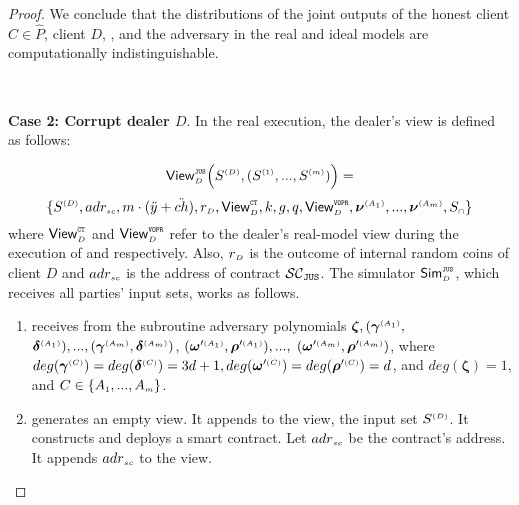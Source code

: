 \begin{proof}
We conclude that the distributions of the joint outputs of the honest client $C\in \hat P$, client $D$, \aud, and the adversary in the real and ideal models are computationally indistinguishable.


\

\noindent\textbf{Case 2: Corrupt dealer $D$}.  In the real execution, the dealer's view is defined as follows: 


$$ \mathsf{View}_{\scriptscriptstyle D}^{\scriptscriptstyle \mathtt{JUS}} \Big(S^{\scriptscriptstyle (D)},(S^{\scriptscriptstyle (1)},..., S^{\scriptscriptstyle (m)})\Big)=$$ $$ \{S^{\scriptscriptstyle (D)}, adr_{\scriptscriptstyle sc}, m\cdot(\ddot{y}+\ddot{ch}), r_{\scriptscriptstyle D}, \mathsf{View}^{\scriptscriptstyle \mathtt{CT}}_{\scriptscriptstyle D}, k, g, q, \mathsf{View}^{\scriptscriptstyle \mathtt{VOPR}}_{\scriptscriptstyle D}, \bm\nu^{\scriptscriptstyle (A_1)},..., \bm\nu^{\scriptscriptstyle (A_m)}, S_{\scriptscriptstyle \cap}\}$$
%
where  $\mathsf{View}^{\scriptscriptstyle \mathtt{CT}}_{\scriptscriptstyle D}$ and $\mathsf{View}^{\scriptscriptstyle \mathtt{VOPR}}_{\scriptscriptstyle D}$ refer to the dealer's real-model view during the execution of \ct and \vopr respectively. Also, $r_{\scriptscriptstyle D}$ is the outcome of internal random coins of client $D$ and $adr_{\scriptscriptstyle sc}$ is the address of contract $\mathcal{SC}_{\mathtt{JUS}}$. The simulator $\mathsf{Sim}^{\scriptscriptstyle \mathtt{JUS}}_{\scriptscriptstyle D}$, which receives all parties' input sets, works as follows. 

\begin{enumerate}

\item receives from the subroutine adversary polynomials $ {\bm\zeta}, ( {\bm\gamma}^{\scriptscriptstyle(A_1)},$ $  {\bm\delta}^{\scriptscriptstyle (A_1)}),..., ( {\bm\gamma}^{\scriptscriptstyle(A_m)},  {\bm\delta}^{\scriptscriptstyle (A_m)})$,  $( {\bm\omega}'^{\scriptscriptstyle (A_1)},  {\bm\rho}'^{\scriptscriptstyle (A_1)}),..., $ $( {\bm\omega}'^{\scriptscriptstyle (A_m)},  {\bm\rho}'^{\scriptscriptstyle (A_m)})$, where $deg( {\bm\gamma}^{\scriptscriptstyle(C)})=deg( {\bm\delta}^{\scriptscriptstyle(C)})=3d+1,  deg( {\bm\omega}'^{\scriptscriptstyle (C)}) =\\ deg( {\bm\rho}'^{\scriptscriptstyle (C)})= d$, and $deg( {\bm\zeta})=1$, and $C\in  \{  {  A}_{ \scriptscriptstyle {   1}}, ...,   {  A}_{ \scriptscriptstyle {   m}}\} $.
%
\item generates an empty view. It appends to the view, the input set $S^{\scriptscriptstyle (D)}$. It constructs and deploys a smart contract. Let $  {adr}_{\scriptscriptstyle sc}$ be the contract's address. It appends $ {adr}_{\scriptscriptstyle sc}$ to the view. 



\end{enumerate}
\end{proof}
